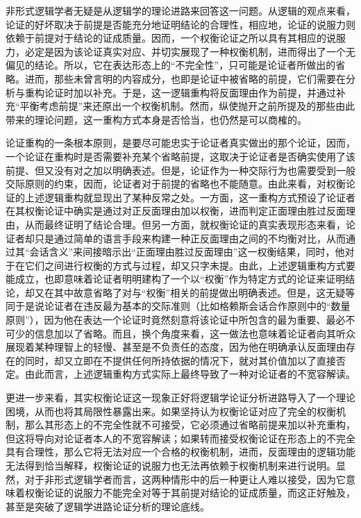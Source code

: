 \documentclass[b5paper,10.5pt,onecolumn,twoside,UTF8]{article}
\begin{document}
非形式逻辑学者无疑是从逻辑学的理论进路来回答这一问题。从逻辑的观点来看，论证的好坏取决于前提是否能充分地证明结论的合理性，相应地，论证的说服力则依赖于前提对于结论的证成质量。因而，一个权衡论证之所以具有其相应的说服力，必定是因为该论证真实对应、并切实展现了一种权衡机制，进而得出了一个无偏见的结论。所以，它在表达形态上的“不完全性”，只可能是论证者所做出的省略。进而，那些未曾言明的内容成分，也即是论证中被省略的前提，它们需要在分析与重构论证时加以补充。于是，这一逻辑重构将反面理由作为前提，并通过补充“平衡考虑前提”来还原出一个权衡机制。然而，纵使抛开之前所提及的那些由此带来的理论问题，这一重构方式本身是否恰当，也仍然是可以商\mbox{榷的。}

论证重构的一条根本原则，是要尽可能忠实于论证者真实做出的那个论证，因而，一个论证在重构时是否需要补充某个省略前提，这取决于论证者是否确实使用了该前提、但又没有对之加以明确表述。但是，论证作为一种交际行为也需要受到一般交际原则的约束，因而，论证者对于前提的省略也不能随意。由此来看，对权衡论证的上述逻辑重构就显现出了某种反常之处。一方面，这一重构方式预设了论证者在其权衡论证中确实是通过对正反面理由加以权衡，进而判定正面理由胜过反面理由，从而最终证明了结论合理。但另一方面，就权衡论证的真实表现形态来看，论证者却只是通过简单的语言手段来构建一种正反面理由之间的不均衡对比，从而通过其“会话含义”来间接暗示出“正面理由胜过反面理由”这一权衡结果，同时，他对于在它们之间进行权衡的方式与过程，却又只字未提。由此，上述逻辑重构方式要能成立，也即意味着论证者明明建构了一个以“权衡”作为特定方式的论证来证明结论，却又在其中故意省略了对与“权衡”相关的前提做出明确表述。但是，这无疑等同于是说论证者在违反最为基本的交际准则（比如格赖斯会话合作原则中的“数量原则”），因为他在表达一个论证时竟然刻意将该论证中所包含的最为重要、最必不可少的信息加以了省略。而且，换个角度来看，这一做法也意味着论证者向其听众展现着某种理智上的轻慢、甚至是不负责任的态度，因为他在明确承认反面理由存在的同时，却又立即在不提供任何所持依据的情况下，就对其价值加以了直接否定。由此而言，上述逻辑重构方式实际上最终导致了一种对论证者的不宽容解读。

更进一步来看，其实权衡论证这一现象正好将逻辑学论证分析进路导入了一个理论困境，从而也将其局限性暴露出来。如果坚持认为权衡论证对应了完全的权衡机制，那么其形态上的不完全性就不可接受，它必须通过省略前提来加以补充重构，但这将导向对论证者本人的不宽容解读；如果转而接受权衡论证在形态上的不完全具有合理性，那么它将无法对应一个合格的权衡机制，进而，反面理由的逻辑功能无法得到恰当解释，权衡论证的说服力也无法再依赖于权衡机制来进行说明。显然，对于非形式逻辑学者而言，这两种情形中的后一种更让人难以接受，因为它意味着权衡论证的说服力不能完全对等于其前提对结论的证成质量，而这正好触及，甚至是突破了逻辑学进路论证分析的理论底线。
\end{document}
